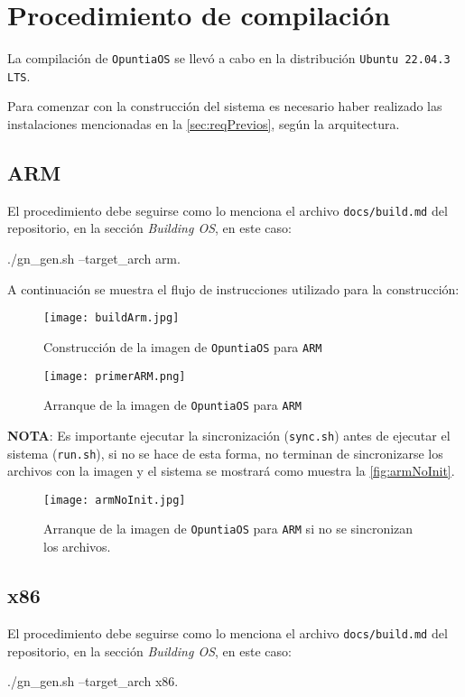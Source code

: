 \section{Procedimiento de compilación}
La compilación de \texttt{OpuntiaOS} se llevó a cabo en la distribución 
\texttt{Ubuntu 22.04.3 LTS}.



Para comenzar con la construcción del sistema es necesario haber realizado las
instalaciones mencionadas en la \autoref{sec:reqPrevios}, según la arquitectura.
	

\subsection{ARM}
	El procedimiento debe seguirse como lo menciona el archivo \texttt{docs/build.md} del repositorio, en la sección \textit{Building OS}, en este caso:
	\begin{center}
		\ttfamily
		./gn\_gen.sh --target\_arch arm.
	\end{center}
	
	A continuación se muestra el flujo de instrucciones utilizado para la construcción:
	\begin{figure}[ht]
		\centering
		\texttt{[image: buildArm.jpg]}
		\caption{
			Construcción de la imagen de \texttt{OpuntiaOS} para \texttt{ARM}
			\label{fig:buildArm}
		}
	\end{figure}
	\begin{figure}[ht]
		\centering
		\texttt{[image: primerARM.png]}
		\caption{
			Arranque de la imagen de \texttt{OpuntiaOS} para \texttt{ARM}
			\label{fig:buildArm_res}
		}
	\end{figure}

	\textbf{NOTA}: Es importante ejecutar la sincronización (\texttt{sync.sh}) antes de 
	ejecutar el sistema (\texttt{run.sh}), si no se hace de esta forma, no terminan de sincronizarse los archivos con la imagen y el sistema se mostrará como muestra la \autoref{fig:armNoInit}.
	\begin{figure}[ht]
		\centering
		\texttt{[image: armNoInit.jpg]}
		\caption{
			Arranque de la imagen de \texttt{OpuntiaOS} para \texttt{ARM} si no se sincronizan los archivos.
			\label{fig:armNoInit}
		}
	\end{figure}





\newpage
\subsection{x86}
	El procedimiento debe seguirse como lo menciona el archivo \texttt{docs/build.md} del repositorio, en la sección \textit{Building OS}, en este caso:
	\begin{center}
		\ttfamily
		./gn\_gen.sh --target\_arch x86.
	\end{center}
	
